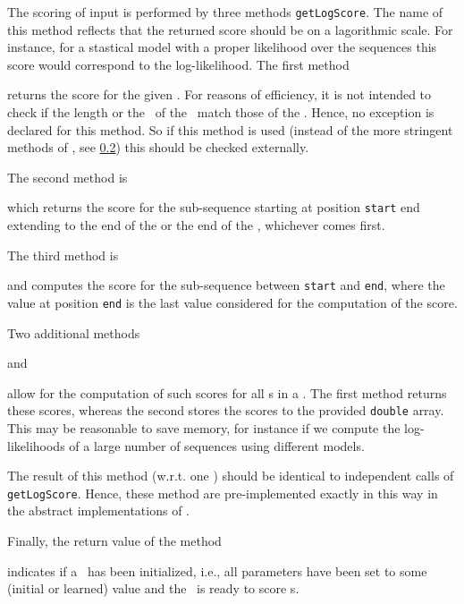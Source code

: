 The scoring of input \Sequence is performed by three methods \lstinline+getLogScore+. The name of this method reflects that the returned score should be on a lagorithmic scale. For instance, for a stastical model with a proper likelihood over the sequences this score would correspond to the log-likelihood.
The first method
\addtocounter{off}{10}
returns the score for the given \Sequence. For reasons of efficiency, it is not intended to check if the length or
the \AlphabetContainer~of the \Sequence~match those of the \SeqScore. Hence, no exception is declared for this method. So if
this method is used (instead of the more stringent methods of \StatMod, see \ref{}) this should be checked externally.

The second method is
\addtocounter{off}{13}
which returns the score for the sub-sequence starting at position \lstinline+start+ end extending to the end of the \Sequence or the end of the \SeqScore, whichever comes first.

The third method is
\addtocounter{off}{17}
and computes the score for the sub-sequence between \lstinline+start+ and \lstinline+end+, where the value at position \lstinline+end+ is the last value considered for the computation of the score.

Two additional methods
\addtocounter{off}{25}
and
\addtocounter{off}{26}
allow for the computation of such scores for all \Sequence s in a \DataSet. The first method returns these scores, whereas the second stores the scores to the provided \lstinline+double+ array. This may be reasonable to save memory, for instance if we compute the log-likelihoods of a large number of sequences using different models.

The result of this method (w.r.t. one \Sequence) should be identical
to independent calls of \lstinline+getLogScore+. Hence, these method are pre-implemented exactly in this way in the abstract implementations
of \SeqScore.

Finally, the return value of the method
\addtocounter{off}{9}
indicates if a \SeqScore~has been initialized, i.e., all parameters have been set to some (initial or learned) value and the \SeqScore~is
ready to score \Sequence s.

\subsection{\DiffSS}

\subsection{\StatMod}

